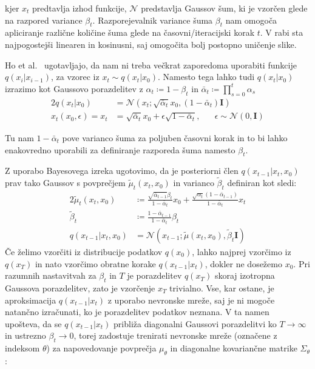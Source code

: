 \documentclass[12pt, a4paper]{article}
\begin{document}
kjer $x_t$ predtavlja izhod funkcije, $\mathcal{N}$ predstavlja Gaussov šum, ki je vzorčen glede na razpored variance $\beta_t$. Razporejevalnik variance šuma $\beta_t$ nam omogoča apliciranje različne količine šuma glede na časovni/iteracijski korak $t$. V rabi sta najpogostejši linearen in kosinusni, saj omogočita bolj postopno uničenje slike.


Ho et al.~\cite{DDPM} ugotavljajo, da nam ni treba večkrat zaporedoma uporabiti funkcije $q(x_i|x_{i-1})$, za vzorec iz $x_t \sim q(x_t|x_0)$. Namesto tega lahko tudi $q(x_t|x_0)$ izrazimo kot Gaussovo porazdelitev z $\alpha_t \coloneqq 1 - \beta_t$ in $\bar{\alpha}_t \coloneqq \prod_{s=0}^{t} \alpha_s$
%
\begin{alignat}{2}
    q(x_t|x_0) &= \mathcal{N}(x_t; \sqrt{\bar{\alpha}_t} x_0, (1-\bar{\alpha}_t) \mathbf{I}) \\
    x_t(x_0, \epsilon) = x_t &= \sqrt{\bar{\alpha}_t} x_0 + \epsilon \sqrt{1-\bar{\alpha}_t},\quad\text{  } \epsilon \sim \mathcal{N}(0, \mathbf{I}) \label{eq:jumpnoise}
\end{alignat}

Tu nam $1 - \bar{\alpha}_t$ pove varianco šuma za poljuben časovni korak in to bi lahko enakovredno uporabili za definiranje razporeda šuma namesto $\beta_t$.

Z uporabo Bayesovega izreka ugotovimo, da je posteriorni člen $q(x_{t-1}|x_t,x_0)$ prav tako Gaussov s povprečjem $\tilde{\mu}_t(x_t,x_0)$ in varianco $\tilde{ \beta}_t$ definiran kot sledi:
%
\begin{alignat}{2}
    \tilde{\mu}_t(x_t,x_0) &\coloneqq \frac{\sqrt{\bar{\alpha}_{t-1}}\beta_t}{1-\bar{\alpha}_t}x_0 + \frac{\sqrt{\alpha_t}(1-\bar{\alpha}_{t-1})}{1-\bar{\alpha}_t} x_t \label{eq:mutilde} \\
    \tilde{\beta}_t &\coloneqq \frac{1-\bar{\alpha}_{t-1}}{1-\bar{\alpha}_t} \beta_t \label{eq:betatilde} \\
    q(x_{t-1}|x_t,x_0) &= \mathcal{N}(x_{t-1}; \tilde{\mu}(x_t, x_0), \tilde{\beta}_t \mathbf{I}) \label{eq:posterior}
\end{alignat}
Če želimo vzorčiti iz distribucije podatkov $q(x_0)$, lahko najprej vzorčimo iz $q(x_T)$ in nato vzorčimo obratne korake $q(x_{t-1}|x_t)$, dokler ne dosežemo $x_0 $. Pri razumnih nastavitvah za $\beta_t$ in $T$ je porazdelitev $q(x_T)$ skoraj izotropna Gaussova porazdelitev, zato je vzorčenje $x_T$ trivialno. Vse, kar ostane, je aproksimacija $q(x_{t-1}|x_t)$ z uporabo nevronske mreže, saj je ni mogoče natančno izračunati, ko je porazdelitev podatkov neznana. V ta namen~\cite{nonequilibrium-thermodynamics} upošteva, da se $q(x_{t-1}|x_t)$ približa diagonalni Gaussovi porazdelitvi ko $T \to \infty$ in ustrezno $\beta_t \to 0$, torej zadostuje trenirati nevronske mreže (označene z indeksom $\theta$) za napovedovanje povprečja $\mu_{\theta}$ in diagonalne kovariančne matrike $\Sigma_{\theta}$:
\end{document}
